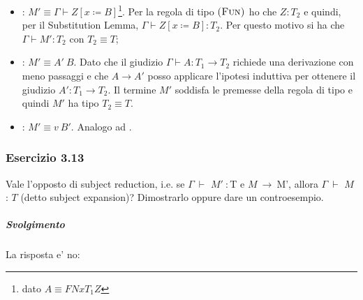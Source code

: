 \begin{description}
  \begin{itemize}
    \item {}: $M' \equiv{} \Gamma \vdash{}
      Z[x \coloneqq{} B]$\footnote{dato $A \equiv{} FN{x}{T_1}Z$}.
      Per la regola di tipo $\textsc{(Fun)}$ ho che $Z : T_2$ e quindi, per
       il Substitution Lemma, $\Gamma \vdash{} Z[x \coloneqq{} B] : T_2$. Per
      questo motivo si ha che $\Gamma \vdash{} M' : T_2$ con $T_2 \equiv T$;
    \item {}: $M' \equiv{} A'\: B$. Dato che il giudizio $\Gamma \vdash A : T_1 \to T_2$ richiede una derivazione con meno passaggi e che $A \to A'$ posso applicare l'ipotesi induttiva per ottenere il giudizio $A' : T_1 \to T_2$. Il termine $M'$ soddisfa le premesse della regola di tipo  e quindi $M'$ ha tipo $T_2 \equiv T$.

    \item {}: $M' \equiv{} v\: B'$. Analogo ad .
  \end{itemize}

 
\end{description}




\subsubsection*{Esercizio 3.13}

Vale l'opposto di subject reduction, i.e. se $\Gamma\:\vdash$ $M'\: :  $T e $M\:\rightarrow\:$M', allora $\Gamma\:\vdash$ $M$ : $T$ (detto subject expansion)? Dimostrarlo oppure dare un controesempio.
\subparagraph*{Svolgimento}
La risposta e' no:

